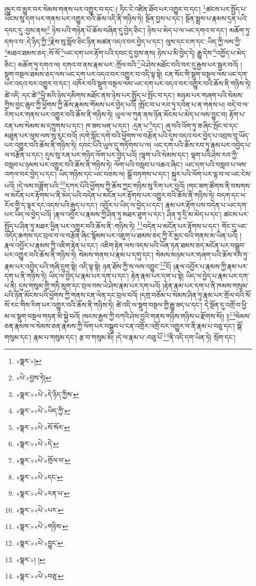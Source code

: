 །མྱུར་བ་མྱུར་བར་སེམས་གནས་པར་འགྱུར་བ་དང་:། ཏིང་ངེ་འཛིན་ཐོབ་པར་འགྱུར་བ་དང་། \footnote{«སྣར་»།  }ཚངས་པར་སྤྱོད་པ་ཡོངས་སུ་དག་པར་གནས་པར་འགྱུར་བའི་ཆོས་འདི་ནི་གཉིས་ཏེ། སྔོན་བྱས་པ་དང་། སྔོན་སྨྲས་པ་རྣམས་དྲན་པའི་དབང་དུ་:བྱས་ནས།\footnote{«པེ་»བྱས་ཏེ།} ཉེས་པའི་གཉེན་པོ་ཆོས་བཞིན་དུ་བྱེད་ཅིང་། ཉེས་པ་མེད་པ་ལ་ཡང་དགའ་བ་དང་། མཆོག་ཏུ་དགའ་བ་:དེ་ཉིད་ཀྱི་\footnote{«སྣར་»«པེ་»དེ་ཉིད་ཀྱིས་}རྗེས་སུ་སློབ་ཅིང་ཉིན་མཚན་འདའ་བར་བྱེད་པ་དང་། ལུས་དང་ངག་དང་:ཡིད་ཀྱི་ལས་ཀྱི་\footnote{«སྣར་»«པེ་»ཡིད་ཀྱི་}མཐའ་ཐམས་ཅད་:སོ་སོ་\footnote{«སྣར་»«པེ་»སོ་སོར་}ཡང་དག་པར་རྟོག་པའི་དབང་དུ་བྱས་ནས། ཉེས་པ་མི་བྱེད་དེ། རྒྱུ་དེས་\footnote{«སྣར་»«པེ་»དེ་}འགྱོད་པ་མེད་ཅིང་། མཆོག་ཏུ་དགའ་ལ། དགའ་བ་ནས་རྣམ་པར་:གྲོལ་བའི་\footnote{«སྣར་»«པེ་»གྲོལ་བ་}ཡེ་ཤེས་མཐོང་བའི་བར་དུ་རྒྱས་པར་སྦྱར་བའོ། །སྡུག་བསྔལ་ཐམས་ཅད་ལས་ཡང་དག་པར་འདའ་བར་འགྱུར་བ་འདི་ལྟ་སྟེ། ངན་སོང་གི་སྡུག་བསྔལ་ལས་ཡང་དག་པར་འདའ་བར་འགྱུར་བ་དང་། འཁོར་བའི་སྡུག་བསྔལ་ལས་ཡང་དག་པར་འདའ་བར་འགྱུར་བའི་ཆོས་ནི་གཉིས་ཏེ། ཚེ་འདི་:དང་ཚེ་\footnote{«སྣར་»«པེ་»དང་}ཕྱི་མའི་ཉེས་དམིགས་མཐོང་ནས་ཉེས་པར་སྤྱོད་པ་སྤོང་བ་དང་། མཉམ་པར་གཞག་པའི་སེམས་ཀྱིས་བྱང་ཆུབ་ཀྱི་ཕྱོགས་ཀྱི་ཆོས་རྣམས་གོམས་པར་བྱེད་པའོ། །སྤོང་བ་པ་རབ་ཏུ་དབེན་པ་ན་གནས་པ། བདེ་བ་ལ་རེག་པར་གནས་པར་འགྱུར་བའི་ཆོས་ནི་གཉིས་ཏེ། ཡུལ་ལ་ཀུན་ནས་ཉོན་མོངས་པ་མེད་པ་ལས་བྱུང་བ། རྟོག་པ་ངན་པས་སེམས་མ་དཀྲུགས་པ་དང་། ཁ་ཟས་ཕན་པ་དང་། :དྲན་པ་\footnote{«སྣར་»«པེ་»རན་པ་}དང་། ཞུ་བའི་འོག་ཏུ་ཟ་ཞིང་སྤོང་བ་དང་མཐུན་པར་ལུས་ལས་སུ་རུང་བའོ། །དགེ་སློང་དགེ་བའི་ཕྱོགས་ལ་བརྩོན་པའི་དུས་འདའ་བར་བྱེད་པ་འབྲས་བུ་ཡོད་པར་འགྱུར་བའི་ཆོས་ནི་གཉིས་ཏེ། དབང་པོའི་ཡུལ་དུ་གཏོགས་པ་ལ། ཡང་དག་པའི་ཆོས་རབ་ཏུ་རྣམ་པར་འབྱེད་པ་ལ་བརྩོན་པ་དང་། དུས་སུ་རན་པར་གཉིད་ལོག་པར་བྱེད་པའོ། །ལྷག་པའི་སེམས་དང་། ལྷག་པའི་ཤེས་རབ་ཀྱི་བསླབ་པ་ཉམས་པར་འགྱུར་བའི་ཆོས་ནི་གཉིས་ཏེ། ལོག་པའི་བསླབ་པ་འཆའ་ཞིང་། ཡང་དག་པའི་བསླབ་པ་ལས་འགལ་བར་བྱེད་པ་དང་། ཡིད་གཉིས་དང་ཡང་བཅས་ལ། སྒྲོ་བཏགས་པ་དང་། སྐུར་པའི་ལོག་པར་ལྟ་བ་ལ་ཡང་ངེས་པའོ། །དེ་ལས་བཟློག་པའི་\footnote{«སྣར་»«པེ་»པར་}དཀར་པོའི་ཕྱོགས་ཀྱི་ཆོས་ཀྱང་གཉིས་སུ་རིག་པར་བྱའོ། །གང་ཟག་ཚོགས་ནི་བསགས་ལ་མངོན་པར་རྟོགས་པ་ནི་མེད་པའི་བདེན་པ་མངོན་པར་རྟོགས་པར་འགྱུར་བའི་ཆོས་ནི་གཉིས་ཏེ། བདག་དང་ཕ་རོལ་གྱི་ད་ལྟར་དང་འདས་པའི་རྒུད་པ་དང་། འབྱོར་པ་ཡིད་ལ་བྱེད་པ་དང་། རྣམ་པར་རྟོག་པས་བདེན་པ་ཡང་དག་པར་ཡིད་ལ་བྱེད་པའོ། །རྣལ་འབྱོར་པ་རྣམས་ཀྱི་ཤིན་ཏུ་མཐར་ཐུག་པ་དང་། ཤིན་ཏུ་དྲི་མ་མེད་པ་དང་། ཚངས་པར་སྤྱོད་པ་ཤིན་ཏུ་མཐར་ཕྱིན་པར་འགྱུར་བའི་ཆོས་ནི་:གཉིས་ཏེ། \footnote{«སྣར་»«པེ་»གཉིས་}བདེན་པ་མངོན་པར་རྟོགས་པ་དང་། གོང་དུ་ཡང་འདོད་ཆགས་དང་བྲལ་བ་ལ་བརྩོན་ཞིང་སྙོམས་པར་འཇུག་པ་ཐམས་ཅད་ཀྱི་རོ་མྱང་བའི་གནས་མ་ཡིན་པའོ། །རྣལ་འབྱོར་པ་རྣམས་ཀྱི་འཇིག་རྟེན་པ་དང་། འཇིག་རྟེན་ལས་འདས་པའི་ཡོན་ཏན་ཐམས་ཅད་མངོན་པར་བསྒྲུབ་པར་འགྱུར་བའི་ཆོས་ནི་གཉིས་ཏེ། སེམས་གནས་པ་རྣམ་པ་དགུ་དང་། སེམས་མཉམ་པར་གཞག་པའི་ཆོས་རབ་ཏུ་རྣམ་པར་འབྱེད་པའི་གཞི་དྲུག་སྟེ། འདི་ལྟ་སྟེ། ཉན་ཐོས་ཀྱི་ས་ལས་འབྱུང་\footnote{«སྣར་»«པེ་»བྱུང་}ངོ། །རྣལ་འབྱོར་པ་རྣམས་ཀྱི་རྣམ་པར་དག་པ་ནི་གཉིས་ཏེ། ཡིད་ལ་བྱེད་པ་རྣམ་པར་དག་པ་དང་། རྟེན་རྣམ་པར་དག་པ་སྟེ། ཡིད་ལ་བྱེད་པ་རྣམ་པར་དག་པ་ནི། དུས་གསུམ་གྱི་གཏི་མུག་དང་བྲལ་བས་ཡེ་ཤེས་རྣམ་པར་དག་པའོ། །རྟེན་རྣམ་པར་དག་པ་ནི་ཁམས་གསུམ་པའི་ཉོན་མོངས་པའི་ཕྱོགས་ཀྱི་གནས་ངན་ལེན་དང་བྲལ་བའོ། །དགྲ་བཅོམ་པ་སེམས་ཤིན་ཏུ་རྣམ་པར་གྲོལ་བའི་སོ་སོ་རང་གིས་རིག་པར་འགྱུར་བའི་ཆོས་ནི་གཉིས་ཏེ། ཚེ་འདི་ལ་སྡུག་བསྔལ་གྱི་རྒྱུ་ཟད་པ་དང་། དེ་སྔོན་དུ་འགྲོ་བ་ཕྱི་མ་ལ་སྡུག་བསྔལ་གཏན་མི་སྐྱེ་བའོ། །སངས་རྒྱས་ཀྱི་བཀའི་ཤེས་བྱའི་གནས་གཉིས་གཉིས་པ་རྫོགས་སོ།། །།\footnote{«སྣར་»། །}སེམས་ཅན་རྣམས་ལ་སེམས་ཅན་རྣམས་ཀྱི་ལོག་པར་བསྒྲུབ་པ་ངན་འགྲོར་འགྲོ་བར་འགྱུར་བ་ནི་རྣམ་པ་བཅུ་དང་། སྒོ་གསུམ་དང་། རྣམ་པ་གསུམ་དང་། རྩ་བ་གསུམ་མོ། །དེ་ལ་རྣམ་པ་:བཅུ་པོ་\footnote{«སྣར་»«པེ་»བཅུ་}ནི་འདི་དག་ཡིན་ཏེ། སྲོག་དང་། 